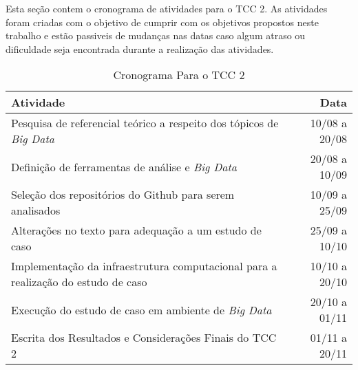 Esta seção contem o cronograma de atividades para o TCC 2. As atividades foram criadas com o objetivo de cumprir com os objetivos propostos neste trabalho e estão passiveis de mudanças nas datas caso algum atraso ou dificuldade seja encontrada durante a realização das atividades.

\begin{table}[h]
    \begin{tabularx}{\textwidth}{|X|r|}
        \toprule
    	\textbf{Atividade} & Data  \\
    	\hline	
            \midrule
            Pesquisa de referencial teórico a respeito dos tópicos de \textit{Big Data} & 10/08 a 20/08 \\ \hline
            Definição de ferramentas de análise e \textit{Big Data} & 20/08 a 10/09 \\ \hline
            Seleção dos repositórios do Github para serem analisados & 10/09 a 25/09 \\ \hline
            Alterações no texto para adequação a um estudo de caso & 25/09 a 10/10 \\ \hline
            Implementação da infraestrutura computacional para a realização do estudo de caso & 10/10 a 20/10 \\ \hline
            Execução do estudo de caso em ambiente de \textit{Big Data} & 20/10 a 01/11 \\ \hline
            Escrita dos Resultados e Considerações Finais do TCC 2 & 01/11 a 20/11 \\ \hline
            \bottomrule
    \end{tabularx}
    \label{tab:crono}
    \caption{Cronograma Para o TCC 2}
\end{table}


